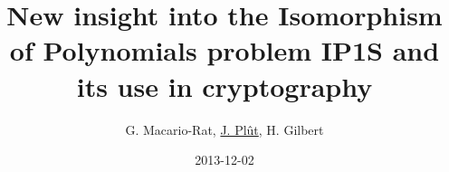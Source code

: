 \documentclass{beamer}%
\begin{document}
\title[New insight into IP1S]%
  {New insight into the Isomorphism of Polynomials problem IP1S and
  its use in cryptography}
\author{G. Macario-Rat, \underline{J. Plût}, H.
Gilbert}
\date{2013-12-02}
%

\begin{frame}
\titlepage
\end{frame}%
\end{document}
